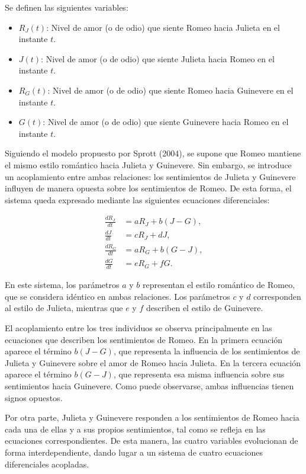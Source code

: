 \documentclass{article}
\begin{document}
Se definen las siguientes variables:

\begin{itemize}
    \item $R_J(t)$: Nivel de amor (o de odio) que siente Romeo hacia Julieta en el instante $t$.
    \item $J(t)$: Nivel de amor (o de odio) que siente Julieta hacia Romeo en el instante $t$.
    \item $R_G(t)$: Nivel de amor (o de odio) que siente Romeo hacia Guinevere en el instante $t$.
    \item $G(t)$: Nivel de amor (o de odio) que siente Guinevere hacia Romeo en el instante $t$.
\end{itemize}

Siguiendo el modelo propuesto por Sprott (2004), se supone que Romeo mantiene el mismo estilo romántico hacia Julieta y Guinevere. Sin embargo, se introduce un acoplamiento entre ambas relaciones: los sentimientos de Julieta y Guinevere influyen de manera opuesta sobre los sentimientos de Romeo. De esta forma, el sistema queda expresado mediante las siguientes ecuaciones diferenciales:

\begin{equation}
\begin{aligned}
    \frac{dR_J}{dt} &= aR_J + b(J-G), \\
    \frac{dJ}{dt} &= cR_J + dJ, \\
    \frac{dR_G}{dt} &= aR_G + b(G-J), \\
    \frac{dG}{dt} &= eR_G + fG.
\end{aligned}
\tag{3}
\end{equation}

En este sistema, los parámetros $a$ y $b$ representan el estilo romántico de Romeo, que se considera idéntico en ambas relaciones. Los parámetros $c$ y $d$ corresponden al estilo de Julieta, mientras que $e$ y $f$ describen el estilo de Guinevere.

El acoplamiento entre los tres individuos se observa principalmente en las ecuaciones que describen los sentimientos de Romeo. En la primera ecuación aparece el término $b(J-G)$, que representa la influencia de los sentimientos de Julieta y Guinevere sobre el amor de Romeo hacia Julieta. En la tercera ecuación aparece el término $b(G-J)$, que representa esa misma influencia sobre sus sentimientos hacia Guinevere. Como puede observarse, ambas influencias tienen signos opuestos.

Por otra parte, Julieta y Guinevere responden a los sentimientos de Romeo hacia cada una de ellas y a sus propios sentimientos, tal como se refleja en las ecuaciones correspondientes. De esta manera, las cuatro variables evolucionan de forma interdependiente, dando lugar a un sistema de cuatro ecuaciones diferenciales acopladas.
\end{document}

